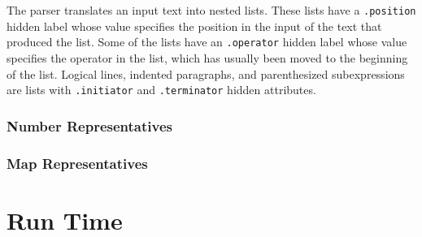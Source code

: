 \documentclass[12pt]{article}
\begin{document}
The parser translates an input text into nested lists.  These
lists have a {\tt .position} hidden label whose value specifies
the position in the input of the text that produced the list.
Some of the lists have an {\tt .operator} hidden label whose
value specifies the operator in the list, which has usually
been moved to the beginning of the list.  Logical lines,
indented paragraphs, and parenthesized subexpressions
are lists with {\tt .initiator} and {\tt .terminator}
hidden attributes.

\subsubsection{Number Representatives}
\label{NUMBER-REPRESENTATIVES}


\subsubsection{Map Representatives}
\label{MAP-REPRESENTATIVES}

\section{Run Time}




\printindex
\end{document}
